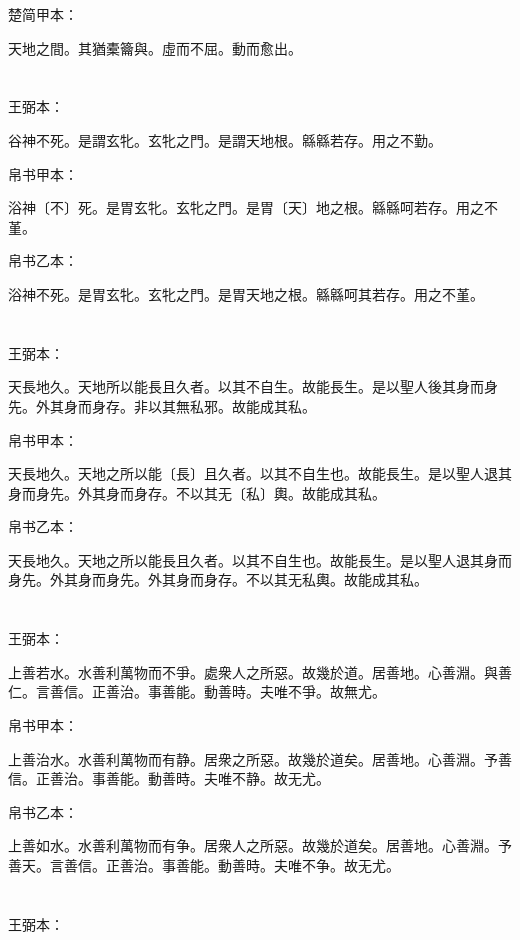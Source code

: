 \documentclass[a5paper]{ctexbook}
\begin{document}
    楚简甲本：

    天地之間。其猶橐籥與。虛而不屈。動而愈出。

    \chapter{}
    王弼本：

    谷神不死。是謂玄牝。玄牝之門。是謂天地根。緜緜若存。用之不勤。

    
    帛书甲本：

    浴神〔不〕死。是胃玄牝。玄牝之門。是胃〔天〕地之根。緜緜呵若存。用之不堇。

    帛书乙本：

    浴神不死。是胃玄牝。玄牝之門。是胃天地之根。緜緜呵其若存。用之不堇。

    \chapter{}
    王弼本：

    天長地久。天地所以能長且久者。以其不自生。故能長生。是以聖人後其身而身先。外其身而身存。非以其無私邪。故能成其私。

    
    帛书甲本：

    天長地久。天地之所以能〔長〕且久者。以其不自生也。故能長生。是以聖人退其身而身先。外其身而身存。不以其无〔私〕輿。故能成其私。

    帛书乙本：

    天長地久。天地之所以能長且久者。以其不自生也。故能長生。是以聖人退其身而身先。外其身而身先。外其身而身存。不以其无私輿。故能成其私。

    \chapter{}
    王弼本：

    上善若水。水善利萬物而不爭。處衆人之所惡。故幾於道。居善地。心善淵。與善仁。言善信。正善治。事善能。動善時。夫唯不爭。故無尤。

    
    帛书甲本：

    上善治水。水善利萬物而有静。居衆之所惡。故幾於道矣。居善地。心善淵。予善信。正善治。事善能。動善時。夫唯不静。故无尤。

    帛书乙本：

    上善如水。水善利萬物而有争。居衆人之所惡。故幾於道矣。居善地。心善淵。予善天。言善信。正善治。事善能。動善時。夫唯不争。故无尤。

    \chapter{}
    王弼本：
\end{document}
